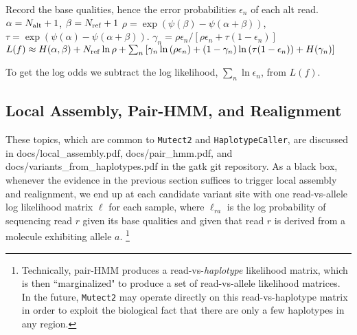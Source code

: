 \documentclass[nofootinbib,amssymb,amsmath]{revtex4}
\newcommand{\code}[1]{\texttt{#1}}
\begin{document}
\begin{algorithm}
\begin{algorithmic}[1]
\State Record the base qualities, hence the error probabilities $\epsilon_n$ of each alt read.
\State $\alpha = N_{\rm alt} + 1$, $\beta = N_{\rm ref} + 1$
\State $\rho = \exp \left( \psi(\beta) - \psi(\alpha + \beta) \right) $, $\tau = \exp \left( \psi(\alpha) - \psi(\alpha + \beta) \right)$.
\State $\gamma_n =  \rho \epsilon_n / \left[ \rho \epsilon_n + \tau (1 - \epsilon_n) \right]$
\State $L(f) \approx H(\alpha, \beta) + N_{\rm ref} \ln \rho + \sum_n \left[ \gamma_n \ln \left( \rho \epsilon_n \right) + (1 - \gamma_n)\ln \left( \tau (1 - \epsilon_n) \right) + H(\gamma_n) \right]$
\end{algorithmic}
\end{algorithm}
To get the log odds we subtract the log likelihood, $\sum_n \ln \epsilon_n$, from $L(f)$.

\subsection{Local Assembly, Pair-HMM, and Realignment}
These topics, which are common to \code{Mutect2} and \code{HaplotypeCaller}, are discussed in docs/local{\_}assembly.pdf, docs/pair{\_}hmm.pdf, and docs/variants{\_}from{\_}haplotypes.pdf in the gatk git repository.  As a black box, whenever the evidence in the previous section suffices to trigger local assembly and realignment, we end up at each candidate variant site with one read-vs-allele log likelihood matrix $\ell$ for each sample, where $ \ell_{ra}$ is the log probability of sequencing read $r$ given its base qualities and given that read $r$ is derived from a molecule exhibiting allele $a$.  \footnote{Technically, pair-HMM produces a read-vs-\textit{haplotype} likelihood matrix, which is then ``marginalized" to produce a set of read-vs-allele likelihood matrices.  In the future, \code{Mutect2} may operate directly on this read-vs-haplotype matrix in order to exploit the biological fact that there are only a few haplotypes in any region.}

\end{document}
